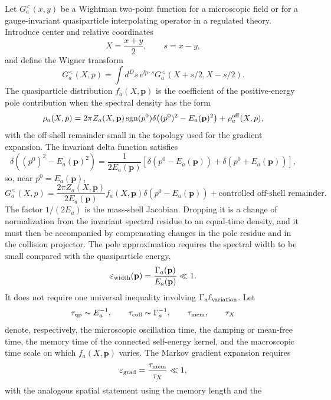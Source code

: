 Let \(G^<_a(x,y)\) be a Wightman two-point function for a microscopic field
or for a gauge-invariant quasiparticle interpolating operator in a regulated
theory.  Introduce center and relative coordinates
\[
  X=\frac{x+y}{2},\qquad s=x-y,
\]
and define the Wigner transform
\[
  G^<_a(X,p)=\int d^Ds\,e^{\ii p\cdot s}G^<_a(X+s/2,X-s/2).
\]
The quasiparticle distribution \(f_a(X,\mathbf p)\) is the coefficient of
the positive-energy pole contribution when the spectral density has the form
\begin{equation}
  \rho_a(X,p)
  =
  2\pi Z_a(X,\mathbf p)\operatorname{sgn}(p^0)
  \delta\!\left((p^0)^2-E_a(\mathbf p)^2\right)
  +\rho^{\rm off}_a(X,p),
  \label{eq:kinetic-narrow-spectral-form}
\end{equation}
with the off-shell remainder small in the topology used for the gradient
expansion.  The invariant delta function satisfies
\[
  \delta\!\left((p^0)^2-E_a(\mathbf p)^2\right)
  =
  \frac{1}{2E_a(\mathbf p)}
  \left[\delta(p^0-E_a(\mathbf p))
  +\delta(p^0+E_a(\mathbf p))\right],
\]
so, near \(p^0=E_a(\mathbf p)\),
\[
  G^<_a(X,p)
  =
  \frac{2\pi Z_a(X,\mathbf p)}{2E_a(\mathbf p)}
  f_a(X,\mathbf p)
  \delta(p^0-E_a(\mathbf p))
  +\text{controlled off-shell remainder}.
\]
The factor \(1/(2E_a)\) is the mass-shell Jacobian.  Dropping it is a
change of normalization from the invariant spectral residue to an
equal-time density, and it must then be accompanied by compensating changes
in the pole residue and in the collision projector.
The pole approximation requires the spectral width to be small compared with
the quasiparticle energy,
\begin{equation}
  \varepsilon_{\rm width}(\mathbf p)
  =
  \frac{\Gamma_a(\mathbf p)}{E_a(\mathbf p)}
  \ll1.
  \label{eq:kinetic-width-small-parameter}
\end{equation}
It does not require one universal inequality involving
\(\Gamma_a\ell_{\rm variation}\).  Let
\[
  \tau_{\rm qp}\sim E_a^{-1},\qquad
  \tau_{\rm coll}\sim\Gamma_a^{-1},\qquad
  \tau_{\rm mem},\qquad
  \tau_X
\]
denote, respectively, the microscopic oscillation time, the damping or
mean-free time, the memory time of the connected self-energy kernel, and the
macroscopic time scale on which \(f_a(X,\mathbf p)\) varies.  The Markov
gradient expansion requires
\begin{equation}
  \varepsilon_{\rm grad}
  =
  \frac{\tau_{\rm mem}}{\tau_X}\ll1,
  \label{eq:kinetic-memory-gradient-small-parameter}
\end{equation}
with the analogous spatial statement using the memory length and the
